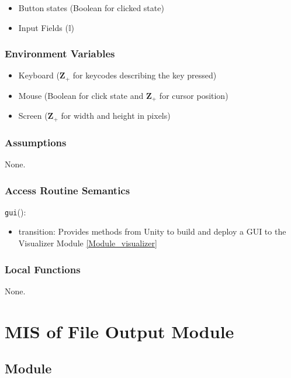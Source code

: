 \documentclass[12pt, titlepage]{article}
\begin{document}
\begin{itemize}
  \item Button states (Boolean for clicked state)
  \item Input Fields ($\mathbb{I}$)
  
\end{itemize}

\subsubsection{Environment Variables}

\begin{itemize}
  \item Keyboard ($\mathbf{Z}_{+}$ for keycodes describing the key pressed)
  \item Mouse (Boolean for click state and  $\mathbf{Z}_{+}$ for cursor position)
  \item Screen ($\mathbf{Z}_{+}$ for width and height in pixels)
\end{itemize}

\subsubsection{Assumptions}

None.

\subsubsection{Access Routine Semantics}

\noindent \texttt{gui}():
\begin{itemize}
\item transition: Provides methods from Unity to build and deploy a GUI to the Visualizer Module \ref{Module_visualizer}
\end{itemize}

\subsubsection{Local Functions}

None.

\newpage

\section{MIS of File Output Module} \label{Module_file_output}

\subsection{Module}
\end{document}
